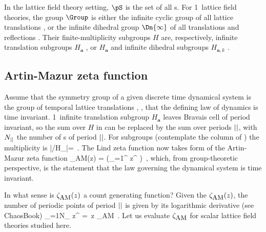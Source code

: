 In the lattice field theory setting, $\pS$ is the set of all
{\lattstate}s.
For 1\dmn\ lattice field theories, the group $\Group$ is either the
{infinite cyclic group}  \Cn{\infty} of all lattice translations ,
or
the {infinite dihedral group} $\Dn{\infty}$  of all translations and
reflections .
Their finite-multiplicity subgroups $H$ are,
respectively, infinite translation subgroups $H_{\mathbf{a}}$
, or $H_{\mathbf{a}}$ and infinite dihedral subgroups
$H_{\mathbf{a},k}$ .

\subsection{Artin-Mazur zeta function}
\label{sect:ArtinMazur}

Assume that the symmetry group of a given discrete time dynamical system
is the group of temporal lattice translations \Cn{\infty}, \ie, that the
defining law of dynamics is time invariant. 1\dmn\ infinite translation
subgroup $H_{\mathbf{a}}$  leaves {Bravais cell} of
{period} \cl{}  invariant, so the sum over $H$ in
 can be replaced by the sum over periods $\cl{}$, with
$N_\cl{}$ the number of {\lattstate}s of period $\cl{}$. For \Cn{\infty}
subgroups (contemplate the \Cn{\infty} column of
) %
the multiplicity is
\beq
|\Cn{\infty}/H_\cl{}|=\cl{}
\,.
The Lind zeta function
 now takes form of the Artin-Mazur zeta
func\-tion
\beq
\zeta_{\mbox{\footnotesize AM}}(z) =
     \exp\left(\sum_{\cl{}=1}^\infty
{} z^\cl{}
         \right)
\,,
which, from group-theoretic perspective, is the statement that the law
governing the dynamical system is time invariant.

In what sense is $\zeta_{\mbox{\footnotesize AM}}(z)$ a {\lattstate}
count generating  function? Given the $\zeta_{\mbox{\footnotesize
AM}}(z)$, the number of periodic points of period $\cl{}$ is given by its
logarithmic derivative (see
{ChaosBook})
\beq
\sum_{\cl{}=1}N_\cl{} z^\cl{}
    = 
            \,z \zeta_{\mbox{\footnotesize AM}}
\,.
Let us evaluate $\zeta_{\mbox{\footnotesize AM}}$ for scalar lattice
field theories studied here.

